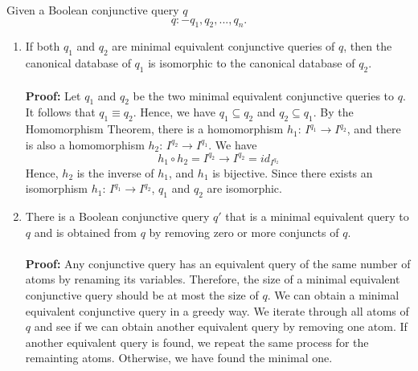 Given a Boolean conjunctive query $q$
\begin{equation*}
  q :- q_1,q_2,...,q_n.
\end{equation*}
\begin{enumerate}
  \item If both $q_1$ and $q_2$ are minimal equivalent conjunctive queries of $q$, then the 
  canonical database of $q_1$ is isomorphic to the canonical database of $q_2$. \\ \\
  \textbf{Proof:} Let $q_1$ and $q_2$ be the two minimal equivalent conjunctive queries to $q$. 
  It follows that $q_1 \equiv q_2$. Hence, we have $q_1 \subseteq q_2$ and $q_2 \subseteq q_1$. 
  By the Homomorphism Theorem, there is a homomorphism $h_1$: $I^{q_1} \rightarrow I^{q_2}$, 
  and there is also a homomorphism $h_2$: $I^{q_2} \rightarrow I^{q_1}$. We have 
  \begin{equation*}
    h_1 \circ h_2 = I^{q_2} \rightarrow I^{q_2} = id_{I^{q_2}} 
  \end{equation*}
  Hence, $h_2$ is the inverse of $h_1$, and $h_1$ is bijective. Since there exists an 
  isomorphism $h_1$: $I^{q_1} \rightarrow I^{q_2}$, $q_1$ and $q_2$ are isomorphic.

  \item There is a Boolean conjunctive query $q'$ that is a minimal equivalent query to $q$ 
  and is obtained from $q$ by removing zero or more conjuncts of $q$. \\ \\
  \textbf{Proof:} Any conjunctive query has an equivalent query of the same 
  number of atoms by renaming its variables. Therefore, the size of a minimal equivalent 
  conjunctive query should be at most the size of $q$. We can obtain a minimal 
  equivalent conjunctive query in a greedy way. We iterate through all atoms of $q$ and 
  see if we can obtain another equivalent query by removing one atom. If another 
  equivalent query is found, we repeat the same process for the remainting atoms. 
  Otherwise, we have found the minimal one.   
\end{enumerate}